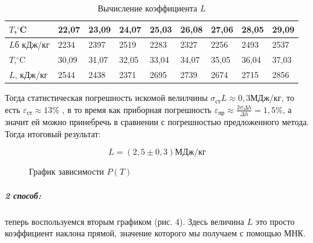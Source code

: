 \documentclass[a4paper,12pt]{article}
\begin{document}
 


\begin{table}[h!] 
	\caption{Вычисление коэффициента $L$}
	\begin{center}
		\begin{tabular}{|*{9}{l|}}
			\hline 
		
			
			
				$T$,$^{\circ}$C & 22,07&	23,09&	24,07&	25,03&26,08& 27,06 &28,05 &29,09 \\ \hline
				$L$б кДж/кг& 2234 & 2397 & 2519 & 2283& 2327 & 2256& 2493& 2537 \\ \hline
				$T$,$^{\circ}$C  &	30,09 &	31,07 &	32,05 &	33,04&	34,07&35,05 &36,04 &	37,03  \\ \hline
				$L$, кДж/кг& 2544&2438& 2371&2695&2739&2674& 2715&2856 \\ \hline
		\end{tabular}
		
	\end{center}
\end{table}

Тогда статистическая погрешность искомой велилчины $  \sigma _{ст}L\approx 0,3 МДж/кг$, то есть $\varepsilon_{ст} \approx 13\%$ , в то время как приборная погрешность $\varepsilon_{пр}\approx \frac{2\sigma\Delta h}{\Delta h} =1,5\% $, а значит ей можно принебречь в сравнении с погрешностью предложенного метода. Тогда итоговый результат: 

$$L = (2,5 \pm 0,3) МДж  / кг$$


\begin{figure}[h!]	
	
\caption{График зависимости $P(T)$}
	
\end{figure}	

\newpage
\subparagraph*{2 способ:} теперь воспользуемся вторым графиком (рис. 4). Здесь величина $L$ это просто коэффициент наклона прямой, значение которого мы получаем с помощью МНК. 
\end{document}
